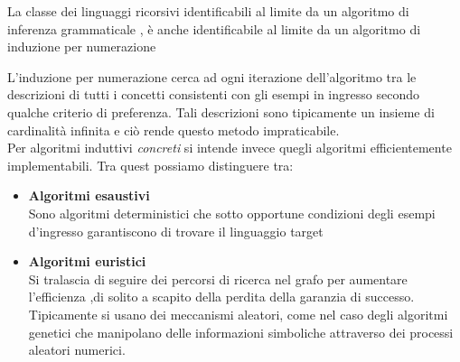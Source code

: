 \begin{description}
\begin{teorema*}La classe dei linguaggi ricorsivi identificabili al limite da un algoritmo di inferenza grammaticale , è anche identificabile al limite da un algoritmo di induzione per numerazione
\end{teorema*} 
 L'induzione per numerazione cerca ad ogni iterazione dell'algoritmo tra le descrizioni di tutti i concetti consistenti con gli esempi in ingresso secondo qualche criterio di preferenza. Tali descrizioni sono tipicamente un insieme di cardinalità infinita e ciò rende questo metodo impraticabile.\\
 Per algoritmi induttivi \textit{concreti} si intende invece quegli algoritmi efficientemente implementabili. Tra quest possiamo distinguere tra:
 \begin{itemize}
 \item \textbf{Algoritmi esaustivi}\\
 Sono algoritmi deterministici che sotto opportune condizioni degli esempi d'ingresso garantiscono di trovare il linguaggio target
 \item \textbf{Algoritmi euristici}\\
 Si tralascia di seguire dei percorsi di ricerca nel grafo per aumentare l'efficienza ,di solito a scapito della perdita della garanzia di successo. Tipicamente si usano dei meccanismi aleatori, come nel caso degli algoritmi genetici che manipolano delle informazioni simboliche attraverso dei processi aleatori numerici.
 \end{itemize}  
\end{description}

